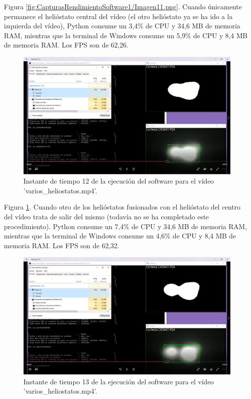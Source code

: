 Figura \ref{fig:CapturasRendimientoSoftware1/Imagen11.png}. Cuando únicamente permanece el helióstato central del vídeo (el otro helióstato ya se ha ido a la izquierda del vídeo), Python consume un 3,4\% de CPU y 34,6 MB de memoria RAM, mientras que la terminal de Windows consume un 5,9\% de CPU y 8,4 MB de memoria RAM. Los FPS son de 62,26.\\[20pt]

\begin{figure}[h!]
  	\centering
	\includegraphics[width=\textwidth]{CapturasRendimientoSoftware1/Imagen12.png}
	\caption{Instante de tiempo 12 de la ejecución del software para el vídeo 'varios\_heliostatos.mp4'.
	\label{fig:CapturasRendimientoSoftware1/Imagen12.png}}
\end{figure}

Figura \ref{fig:CapturasRendimientoSoftware1/Imagen12.png}. Cuando otro de los helióstatos fusionados con el helióstato del centro del vídeo trata de salir del mismo (todavía no se ha completado este procedimiento). Python consume un 7,4\% de CPU y 34,6 MB de memoria RAM, mientras que la terminal de Windows consume un 4,6\% de CPU y 8,4 MB de memoria RAM. Los FPS son de 62,32.\\[20pt]

\begin{figure}[h!]
  	\centering
	\includegraphics[width=\textwidth]{CapturasRendimientoSoftware1/Imagen13.png}
	\caption{Instante de tiempo 13 de la ejecución del software para el vídeo 'varios\_heliostatos.mp4'.
	\label{fig:CapturasRendimientoSoftware1/Imagen13.png}}
\end{figure}

